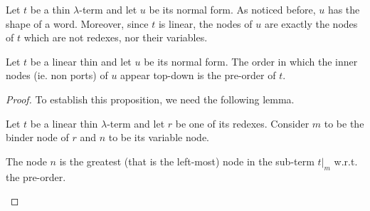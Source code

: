Let $t$ be a thin $\lambda$-term and let $u$ be its normal form. As noticed before, $u$ has the shape of a word. Moreover, since $t$ is linear, the nodes of $u$ are exactly the nodes of $t$ which are not redexes, nor their variables.

\begin{proposition}\label{prop:normal-form-depth-first} Let $t$ be a linear thin \lambdaterm and let $u$ be its normal form. 
The order in which the inner nodes (ie. non ports) of $u$ appear top-down is the pre-order of $t$.  
\end{proposition}

\begin{proof}
To establish this proposition, we need the following lemma.
\begin{lemma}\label{lem:internalLemma}
Let $t$ be a linear thin $\lambda$-term and let $r$ be one of its redexes. Consider $m$ to be the binder node of $r$ and $n$ to be its variable node.

The node $n$ is the greatest (that is the left-most) node in the sub-term $t|_m$ w.r.t. the pre-order. 
\end{lemma}


\end{proof}

